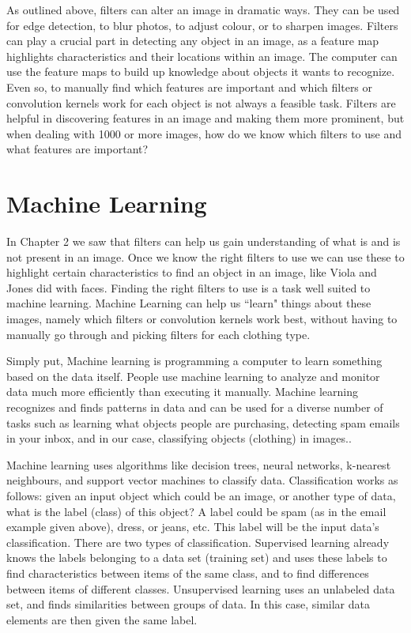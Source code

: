 \documentclass[12pt]{report} %
\begin{document}
	As outlined above, filters can alter an image in dramatic ways. They can be used for edge detection, to blur photos, to adjust colour, or to sharpen images\cite{szeliski2010computer}. Filters can play a crucial part in detecting any object in an image, as a feature map highlights characteristics and their locations within an image. The computer can use the feature maps to build up knowledge about objects it wants to recognize. Even so, to manually find which features are important and which filters or convolution kernels work for each object is not always a feasible task. Filters are helpful in discovering features in an image and making them more prominent, but when dealing with 1000 or more images, how do we know which filters to use and what features are important? 
\chapter{Machine Learning}
	In Chapter 2 we saw that filters can help us gain understanding of what is and is not present in an image. Once we know the right filters to use we can use these to highlight certain characteristics to find an object in an image, like Viola and Jones did with faces\cite{viola2004robust}. Finding the right filters to use is a task well suited to machine learning. Machine Learning can help us ``learn" things about these images, namely which filters or convolution kernels work best, without having to manually go through and picking filters for each clothing type. 
	
	Simply put, Machine learning is programming a computer to learn something based on the data itself. People use machine learning to analyze and monitor data much more efficiently than executing it manually. Machine learning recognizes and finds patterns in data and can be used for a diverse number of tasks such as learning what objects people are purchasing, detecting spam emails in your inbox, and in our case, classifying objects (clothing) in images.\cite{aurelienMachineLearning}. 
	
	Machine learning uses algorithms like decision trees, neural networks, k-nearest neighbours, and support vector machines to classify data. Classification works as follows: given an input object which could be an image, or another type of data, what is the label (class) of this object? A label could be spam (as in the email example given above), dress, or jeans, etc. This label will be the input data's classification. 
	There are two types of classification. Supervised learning already knows the labels belonging to a data set (training set) and uses these labels to find characteristics between items of the same class, and to find differences between items of different classes. Unsupervised learning uses an unlabeled data set, and finds similarities between groups of data. In this case, similar data elements are then given the same label.
\end{document}
